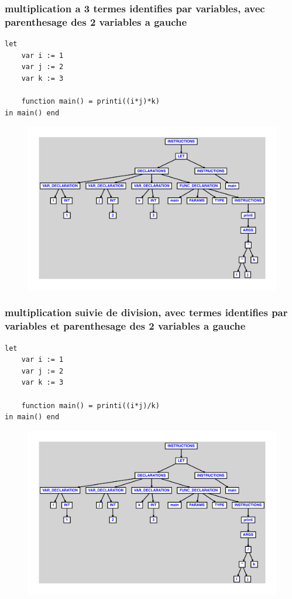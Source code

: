 \documentclass{article}
\begin{document}
\subsubsection{multiplication a 3 termes identifies par variables, avec parenthesage des 2 variables a gauche}
\begin{lstlisting}
let
	var i := 1
	var j := 2
	var k := 3

	function main() = printi((i*j)*k)
in main() end
\end{lstlisting}
\newpage
\begin{figure}[H]
\centering
\includegraphics[max width=\textwidth]{ast/ast_125.pdf}
\end{figure}
\newpage
\subsubsection{multiplication suivie de division, avec termes identifies par variables et parenthesage des 2 variables a gauche}
\begin{lstlisting}
let
	var i := 1
	var j := 2
	var k := 3

	function main() = printi((i*j)/k)
in main() end
\end{lstlisting}
\newpage
\begin{figure}[H]
\centering
\includegraphics[max width=\textwidth]{ast/ast_126.pdf}
\end{figure}
\newpage
\end{document}
